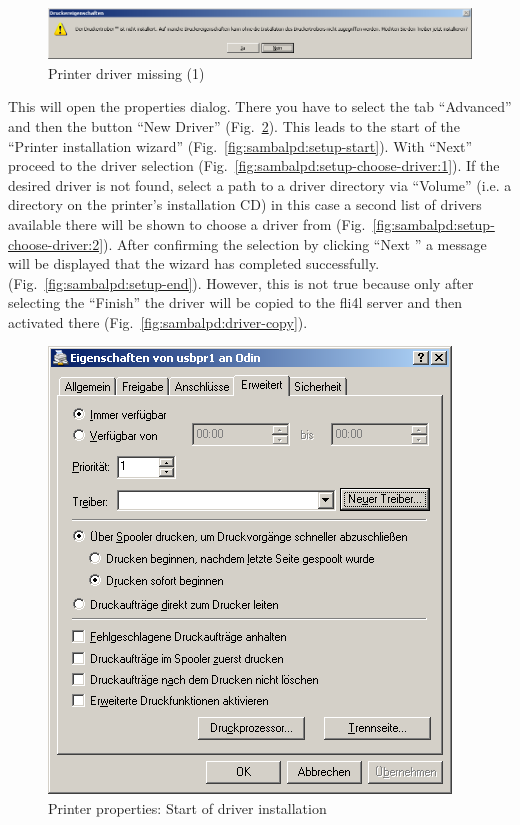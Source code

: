 \begin{figure}[hbt!]
\centering
\includegraphics[width=\columnwidth]{image008}
\caption{Printer driver missing (1)}
\label{fig:sambalpd:no-driver:1}
\end{figure}

This will open the properties dialog. There you have to select the tab
``Advanced'' and then the button ``New Driver''
(Fig.~\ref{fig:sambalpd:props-start-setup}). This leads to the start of the
``Printer installation wizard''
(Fig.~\ref{fig:sambalpd:setup-start}). With ``Next'' proceed to the
driver selection (Fig.~\ref{fig:sambalpd:setup-choose-driver:1}). If the
desired driver is not found, select a path to a driver directory
via ``Volume'' (i.e. a directory on the printer's installation CD)
in this case a second list of drivers available there will be shown
to choose a driver from (Fig.~\ref{fig:sambalpd:setup-choose-driver:2}).
After confirming the selection by clicking ``Next '' a message will be
displayed that the wizard has completed successfully.
(Fig.~\ref{fig:sambalpd:setup-end}). However, this is not true because
only after selecting the ``Finish'' the driver will be copied to the
fli4l server and then activated there
(Fig.~\ref{fig:sambalpd:driver-copy}).

\begin{figure}[hbt!]
\centering
\includegraphics[width=0.8\columnwidth]{image009}
\caption{Printer properties: Start of driver installation}
\label{fig:sambalpd:props-start-setup}
\end{figure}

